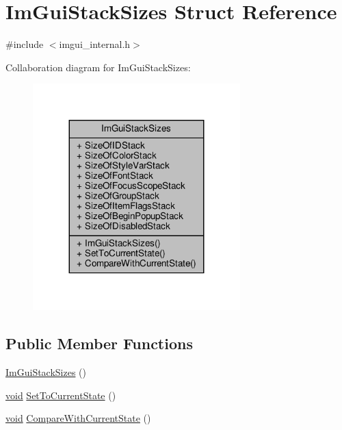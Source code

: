 \hypertarget{structImGuiStackSizes}{}\section{Im\+Gui\+Stack\+Sizes Struct Reference}
\label{structImGuiStackSizes}


{\ttfamily \#include $<$imgui\+\_\+internal.\+h$>$}



Collaboration diagram for Im\+Gui\+Stack\+Sizes\+:
\nopagebreak
\begin{figure}[H]
\begin{center}
\leavevmode
\includegraphics[width=227pt]{structImGuiStackSizes__coll__graph}
\end{center}
\end{figure}
\subsection*{Public Member Functions}
\begin{DoxyCompactItemize}
\item 
\hyperlink{structImGuiStackSizes_ac8d9f1bb427e2480bbae8acc55ee58a2}{Im\+Gui\+Stack\+Sizes} ()
\item 
\hyperlink{imgui__impl__opengl3__loader_8h_ac668e7cffd9e2e9cfee428b9b2f34fa7}{void} \hyperlink{structImGuiStackSizes_aa938d1ee625e4817918a59bb7aaccb69}{Set\+To\+Current\+State} ()
\item 
\hyperlink{imgui__impl__opengl3__loader_8h_ac668e7cffd9e2e9cfee428b9b2f34fa7}{void} \hyperlink{structImGuiStackSizes_aff8cf412bfbdf0a936cae963c25fac55}{Compare\+With\+Current\+State} ()
\end{DoxyCompactItemize}
